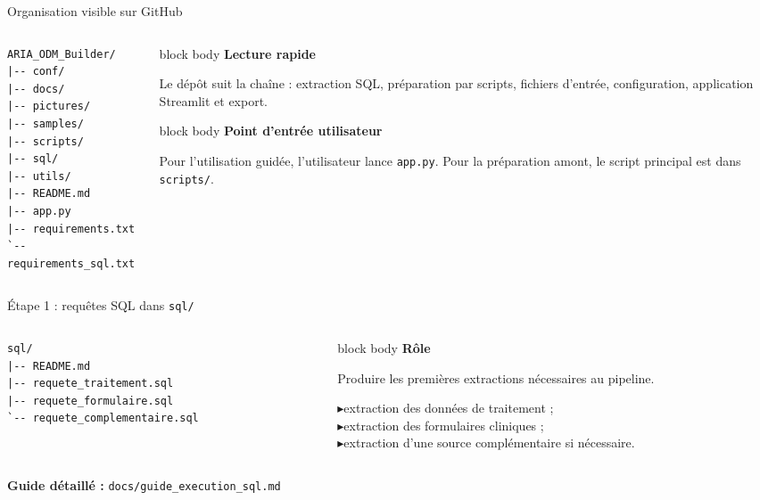 \documentclass[10pt,aspectratio=169]{beamer}
\newcommand{\smallbullet}{\textcolor{MainBlue}{$\blacktriangleright$}\hspace{0.4em}}
\newenvironment{infobox}[1]
{\begin{beamercolorbox}[rounded=true,shadow=false,wd=\linewidth,sep=0.8em]{block body}
\textbf{\color{DarkBlue}#1}\par\vspace{0.3em}}
{\end{beamercolorbox}}
\begin{document}
\begin{frame}[fragile]{Organisation visible sur GitHub}
\begin{columns}[T,onlytextwidth]
\begin{column}{0.46\linewidth}
\begin{lstlisting}
ARIA_ODM_Builder/
|-- conf/
|-- docs/
|-- pictures/
|-- samples/
|-- scripts/
|-- sql/
|-- utils/
|-- README.md
|-- app.py
|-- requirements.txt
`-- requirements_sql.txt
\end{lstlisting}
\end{column}

\begin{column}{0.50\linewidth}
\begin{infobox}{Lecture rapide}
Le dépôt suit la chaîne : extraction SQL, préparation par scripts, fichiers d'entrée, configuration, application Streamlit et export.
\end{infobox}

\vspace{0.5cm}

\begin{infobox}{Point d'entrée utilisateur}
Pour l'utilisation guidée, l'utilisateur lance \texttt{app.py}. Pour la préparation amont, le script principal est dans \texttt{scripts/}.
\end{infobox}
\end{column}
\end{columns}
\end{frame}

\begin{frame}[fragile]{Étape 1 : requêtes SQL dans \texttt{sql/}}
\begin{columns}[T,onlytextwidth]
\begin{column}{0.46\linewidth}
\begin{lstlisting}
sql/
|-- README.md
|-- requete_traitement.sql
|-- requete_formulaire.sql
`-- requete_complementaire.sql
\end{lstlisting}
\end{column}

\begin{column}{0.50\linewidth}
\begin{infobox}{Rôle}
Produire les premières extractions nécessaires au pipeline.

\vspace{0.4em}
\smallbullet extraction des données de traitement ;\\
\smallbullet extraction des formulaires cliniques ;\\
\smallbullet extraction d'une source complémentaire si nécessaire.
\end{infobox}
\end{column}
\end{columns}

\vfill
\centering
\textbf{Guide détaillé :} \texttt{docs/guide\_execution\_sql.md}
\end{frame}
\end{document}
